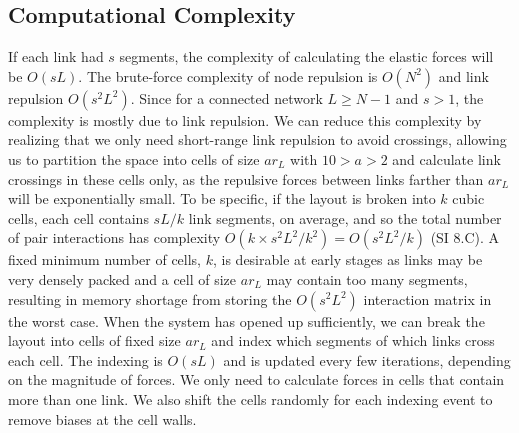 \documentclass[linenumbers,endfloats,nofootinbib,preprint,floatfix,titlepage,superscriptaddress]{revtex4-1} %
\begin{document}
\subsection{Computational Complexity}
If each link had $s$ segments, the  complexity of calculating the elastic forces will be $O(sL)$.
The brute-force complexity of node repulsion is $O(N^2)$ and link repulsion $O(s^2L^2)$.
Since for a connected network $L\geq N-1$ and $s>1$, the complexity is mostly due to link repulsion. 
We can reduce this complexity by realizing that we only need short-range link repulsion to avoid crossings, allowing us to partition the space into cells of size $ar_L$ with $10>a>2$ and calculate link crossings in these cells only, as the repulsive forces between links farther than $ar_L$ will be exponentially small.
To be specific, if the layout is broken into $k$ cubic cells, each cell contains $sL/k$ link segments, on average, and so the total number of pair interactions has complexity
$O(k\times s^2L^2/k^2 ) = O(s^2L^2/k)$ (SI 8.C). 
A fixed minimum number of cells, $k$, is desirable at early stages as links may be very densely packed and a cell of size $ar_L$ may contain too many segments, resulting in memory shortage from storing the $O(s^2L^2)$ interaction matrix in the worst case. 
When the system has opened up sufficiently, we can break the layout into cells of fixed size $ar_L$ and index which segments of which links cross each cell. 
The indexing is $O(sL)$ and is updated every few iterations, depending on the magnitude of forces.
We only need to calculate forces in cells that contain more than one link.
We also shift the cells randomly for each indexing event to remove biases at the cell walls. 
\end{document}
